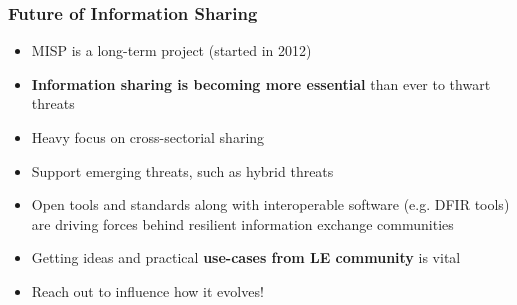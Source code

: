 \begin{frame}
        \frametitle{Future of Information Sharing}
        \begin{itemize}
        \item MISP is a long-term project (started in 2012)
        \item{\bf Information sharing is becoming more essential} than ever to thwart threats
        \item Heavy focus on cross-sectorial sharing
        \item Support emerging threats, such as hybrid threats
        \item Open tools and standards along with interoperable software (e.g. DFIR tools) are driving forces behind resilient information exchange communities
        \item Getting ideas and practical {\bf use-cases from LE community} is vital
        \item Reach out to influence how it evolves!
        \end{itemize}
\end{frame}


